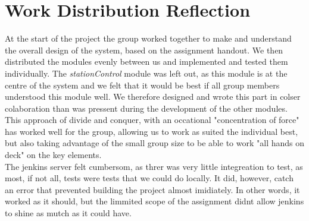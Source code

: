 \section{Work Distribution Reflection}

At the start of the project the group worked together to make and understand the overall design of the system, based on the assignment handout. We then distributed the modules evenly between us and implemented and tested them individually. 
The \textit{stationControl} module was left out, as this module is at the centre of the system and we felt that it would be best if all group members understood this module well. We therefore designed and wrote this part in colser colaboration than was pressent during the development of the other modules.\\

This approach of divide and conquer, with an occational "concentration of force" has worked well for the group, allowing us to work as suited the individual best, but also taking advantage of the small group size to be able to work "all hands on deck" on the key elements.\\

The jenkins server felt cumbersom, as threr was very little integreation to test, as most, if not all, tests were tests that we could do locally. It did, however, catch an error that prevented building the project almost imidiately. In other words, it worked as it should, but the limmited scope of the assignment didnt allow jenkins to shine as mutch as it could have.\\



\newpage